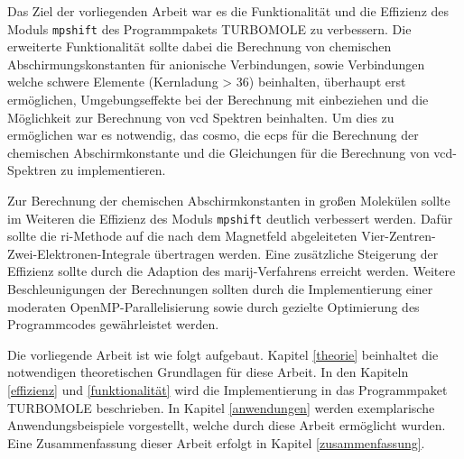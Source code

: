Das Ziel der vorliegenden Arbeit war es die Funktionalität und die Effizienz des Moduls \texttt{mpshift} des Programmpakets \textsc{TURBOMOLE}\supercite{ahlrichs1989electronic,TURBOMOLE,furche2014turbomole} zu verbessern. Die erweiterte Funktionalität sollte dabei die Berechnung von chemischen Abschirmungskonstanten für anionische Verbindungen, sowie Verbindungen welche schwere Elemente (Kernladung > 36) beinhalten, überhaupt erst ermöglichen, Umgebungseffekte bei der Berechnung mit einbeziehen und die Möglichkeit zur Berechnung von \ac{vcd} Spektren beinhalten. Um dies zu ermöglichen war es notwendig, das \ac{cosmo},\supercite{klamt1993cosmo} die \acp{ecp} für die Berechnung der chemischen Abschirmkonstante und die Gleichungen für die Berechnung von \ac{vcd}-Spektren zu implementieren. 

Zur Berechnung der chemischen Abschirmkonstanten in großen Molekülen sollte im Weiteren die Effizienz des Moduls \texttt{mpshift}\supercite{haser1992direct,kollwitz1996direct} deutlich verbessert werden. Dafür sollte die \ac{ri}-Methode auf die nach dem Magnetfeld abgeleiteten Vier-Zentren-Zwei-Elektronen-Integrale übertragen werden. Eine zusätzliche Steigerung der Effizienz sollte durch die Adaption des \ac{marij}-Verfahrens erreicht werden. Weitere Beschleunigungen der Berechnungen sollten durch die Implementierung einer moderaten OpenMP-Parallelisierung sowie durch gezielte Optimierung des Programmcodes gewährleistet werden. 

\bigskip
Die vorliegende Arbeit ist wie folgt aufgebaut. Kapitel \ref{theorie} beinhaltet die notwendigen theoretischen Grundlagen für diese Arbeit. In den Kapiteln \ref{effizienz} und \ref{funktionalität} wird die Implementierung in das Programmpaket \textsc{TURBOMOLE} beschrieben. In Kapitel \ref{anwendungen} werden exemplarische Anwendungsbeispiele vorgestellt, welche durch diese Arbeit ermöglicht wurden. Eine Zusammenfassung dieser Arbeit erfolgt in Kapitel \ref{zusammenfassung}.